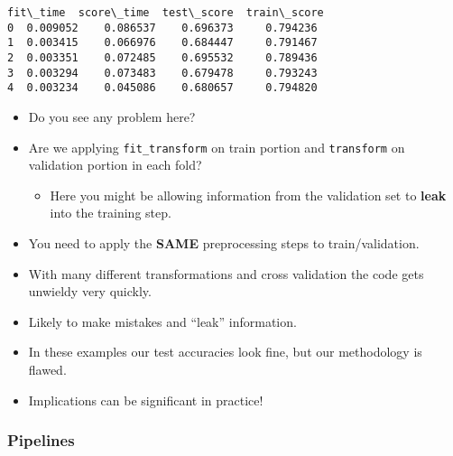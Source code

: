 \documentclass[11pt]{article}
\makeatletter
\providecommand{\tightlist}{%
      \setlength{\itemsep}{0pt}\setlength{\parskip}{0pt}}
\newcommand{\boxspacing}{\kern\kvtcb@left@rule\kern\kvtcb@boxsep}
\newcommand{\prompt}[4]{
        {\ttfamily\llap{{\color{#2}[#3]:\hspace{3pt}#4}}\vspace{-\baselineskip}}
    }
\makeatother
\begin{document}
            \begin{tcolorbox}[breakable, size=fbox, boxrule=.5pt, pad at break*=1mm, opacityfill=0]
\prompt{Out}{outcolor}{44}{\boxspacing}
\begin{Verbatim}[commandchars=\\\{\}]
   fit\_time  score\_time  test\_score  train\_score
0  0.009052    0.086537    0.696373     0.794236
1  0.003415    0.066976    0.684447     0.791467
2  0.003351    0.072485    0.695532     0.789436
3  0.003294    0.073483    0.679478     0.793243
4  0.003234    0.045086    0.680657     0.794820
\end{Verbatim}
\end{tcolorbox}
        
    \begin{itemize}
\tightlist
\item
  Do you see any problem here?
\item
  Are we applying \texttt{fit\_transform} on train portion and
  \texttt{transform} on validation portion in each fold?

  \begin{itemize}
  \tightlist
  \item
    Here you might be allowing information from the validation set to
    \textbf{leak} into the training step.
  \end{itemize}
\end{itemize}

    \begin{itemize}
\tightlist
\item
  You need to apply the \textbf{SAME} preprocessing steps to
  train/validation.
\item
  With many different transformations and cross validation the code gets
  unwieldy very quickly.
\item
  Likely to make mistakes and ``leak'' information.
\end{itemize}

    \begin{itemize}
\tightlist
\item
  In these examples our test accuracies look fine, but our methodology
  is flawed.
\item
  Implications can be significant in practice!
\end{itemize}

    \subsubsection{Pipelines}\label{pipelines}
\end{document}
